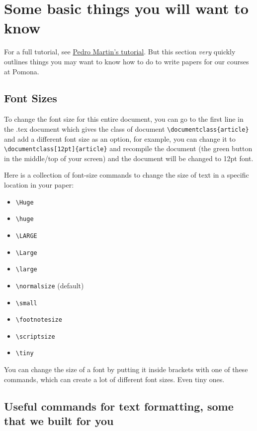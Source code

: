 \documentclass{article}
\begin{document}
\section{Some basic things you will want to know}

For a full tutorial, see \href{http://ptmartins.info/latex/}{Pedro Martin's tutorial}. But this section \textit{very} quickly outlines things you may want to know how to do to write papers for our courses at Pomona. 

\subsection{Font Sizes}

\noindent To change the font size for this entire document, you can go to the first line in the .tex document which gives the class of document \verb|\documentclass{article}| and add a different font size as an option, for example, you can change it to \verb|\documentclass[12pt]{article}| and recompile the document (the green button in the middle/top of your screen) and the document will be changed to 12pt font.  

\noindent Here is a collection of font-size commands to change the size of text in a specific location in your paper: 

\begin{itemize}
    \item \verb|\Huge| 
    \item \verb|\huge| 
    \item \verb|\LARGE| 
    \item \verb|\Large| 
    \item \verb|\large| 
    \item \verb|\normalsize| (default) 
    \item \verb|\small| 
    \item \verb|\footnotesize| 
    \item \verb|\scriptsize| 
    \item \verb|\tiny|
\end{itemize}

\noindent You can change the size of a font by {\huge putting it} inside brackets with {\Large one of these commands}, which can create a {\footnotesize lot of different font sizes}. Even {\tiny tiny ones}.


\subsection{Useful commands for text formatting, some that we built for you}
 \label{UsefulShortcuts}
\end{document}
